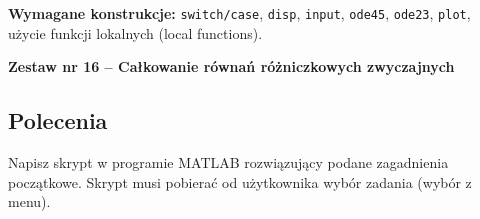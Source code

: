 \documentclass[a4paper,11pt]{article}
\begin{document}
\vspace{0.3cm}
\begin{ramka}
\textbf{Wymagane konstrukcje:}
\texttt{switch/case}, \texttt{disp}, \texttt{input}, \texttt{ode45}, \texttt{ode23}, \texttt{plot}, użycie funkcji lokalnych (local functions).
\end{ramka}

\clearpage
\begin{center}
  {\large\bfseries Zestaw nr 16 \quad -- \quad Całkowanie równań różniczkowych zwyczajnych}
\end{center}
\hrulefill
\vspace{0.4cm}

\subsection*{Polecenia}

Napisz skrypt w programie MATLAB rozwiązujący podane zagadnienia początkowe. Skrypt musi pobierać od użytkownika wybór zadania (wybór z menu).
\end{document}
